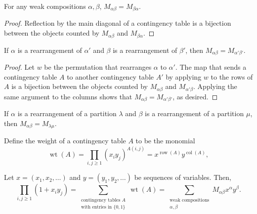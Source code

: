 \begin{fact} \label{fact:Mab-Mba}
	For any weak compositions \(\alpha, \beta\),
	\(M_{\alpha\beta} = M_{\beta\alpha}\).
\end{fact}
\begin{proof}
	Reflection by the main diagonal of a contingency table is a bijection between the objects counted by \(M_{\alpha\beta}\) and \(M_{\beta\alpha}\).
\end{proof}

\begin{fact} \label{fact:Mab-rearrangement}
	If \(\alpha\) is a rearrangement of \(\alpha'\) and \(\beta\) is a rearrangement of \(\beta'\),
	then \(M_{\alpha\beta} = M_{\alpha'\beta'}\).
\end{fact}
\begin{proof}
	Let \(w\) be the permutation that rearranges \(\alpha\) to \(\alpha'\).
	The map that sends a contingency table \(A\) to another contingency table \(A'\) by applying \(w\) to the rows of \(A\) is a bijection between the objects counted by \(M_{\alpha\beta}\) and \(M_{\alpha'\beta}\).
	Applying the same argument to the columns shows that \(M_{\alpha\beta} = M_{\alpha'\beta'}\), as desired.
\end{proof}

\begin{corollary} \label{cor:Mab-Mlm}
	If \(\alpha\) is a rearrangement of a partition \(\lambda\) and \(\beta\) is a rearrangement of a partition \(\mu\),
	then \(M_{\alpha\beta} = M_{\lambda\mu}\).
\end{corollary}

Define the weight of a contingency table \(A\) to be the monomial
\begin{equation}
	\operatorname{wt}(A)
	= \prod_{i, j \geq 1} (x_iy_j)^{A(i, j)}
	= x^{\operatorname{row}(A)}y^{\operatorname{col}(A)},
\end{equation}

\begin{lemma} \label{lem:generating-function-01-contingency-tables-compositions}
	Let \(x = (x_1, x_2, \ldots)\) and \(y = (y_1, y_2, \ldots)\) be sequences of variables.
	Then,
	\begin{equation}
		\prod_{i, j \geq 1} (1 + x_iy_j)
		= \sum_{\substack{\text{contingency tables } A \\ \text{with entries in } \{0, 1\}}} \operatorname{wt}(A)
		= \sum_{\substack{\text{weak compositions} \\ \alpha, \beta}} M_{\alpha\beta} x^\alpha y^\beta.
	\end{equation}
\end{lemma}

